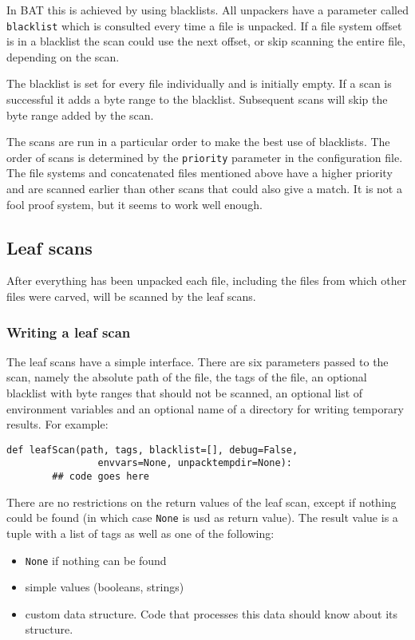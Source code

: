 \documentclass[10pt]{article}
\begin{document}
In BAT this is achieved by using blacklists. All unpackers have a parameter
called \texttt{blacklist} which is consulted every time a file is unpacked. If
a file system offset is in a blacklist the scan could use the next offset, or
skip scanning the entire file, depending on the scan.

The blacklist is set for every file individually and is initially empty. If a
scan is successful it adds a byte range to the blacklist. Subsequent scans
will skip the byte range added by the scan.

The scans are run in a particular order to make the best use of blacklists. The
order of scans is determined by the \texttt{priority} parameter in the
configuration file. The file systems and concatenated files mentioned above
have a higher priority and are scanned earlier than other scans that could also
give a match. It is not a fool proof system, but it seems to work well enough.

\subsection{Leaf scans}

After everything has been unpacked each file, including the files from which
other files were carved, will be scanned by the leaf scans.

\subsubsection{Writing a leaf scan}

The leaf scans have a simple interface. There are six parameters passed to the
scan, namely the absolute path of the file, the tags of the file, an optional
blacklist with byte ranges that should not be scanned, an optional list of
environment variables and an optional name of a directory for writing temporary
results. For example:

\begin{verbatim}
def leafScan(path, tags, blacklist=[], debug=False,
                envvars=None, unpacktempdir=None):
        ## code goes here
\end{verbatim}

There are no restrictions on the return values of the leaf scan, except if
nothing could be found (in which case \texttt{None} is usd as return value).
The result value is a tuple with a list of tags as well as one of the following:

\begin{itemize}
\item \texttt{None} if nothing can be found
\item simple values (booleans, strings)
\item custom data structure. Code that processes this data should know about
its structure.
\end{itemize}
\end{document}
